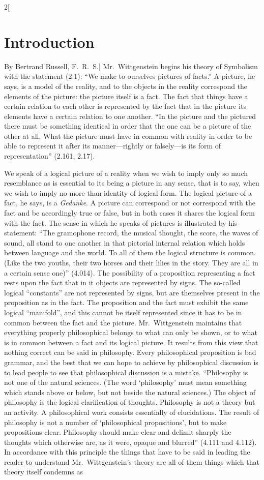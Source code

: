 \documentclass[oneside,openany,12pt]{book}
\begin{document}
\begin{multicols}{2}[\section*{Introduction}By Bertrand Russell, F.\ R.\ S.]
Mr.\ Wittgenstein begins his theory of Symbolism with the statement (2.1): ``We make to ourselves pictures of facts.'' A picture, he says, is a model of the reality, and to the objects in the reality correspond the elements of the picture: the picture itself is a fact. The fact that things have a certain relation to each other is represented by the fact that in the picture its elements have a certain relation to one another. ``In the picture and the pictured there must be something identical in order that the one can be a picture of the other at all. What the picture must have in common with reality in order to be able to represent it after its manner---rightly or falsely---is its form of representation'' (2.161, 2.17).

We speak of a logical picture of a reality when we wish to imply only so much resemblance as is essential to its being a picture in any sense, that is to say, when we wish to imply no more than identity of logical form. The logical picture of a fact, he says, is a \emph{Gedanke}. A picture can correspond or not correspond with the fact and be accordingly true or false, but in both cases it shares the logical form with the fact. The sense in which he speaks of pictures is illustrated by his statement: ``The gramophone record, the musical thought, the score, the waves of sound, all stand to one another in that pictorial internal relation which holds between language and the world. To all of them the logical structure is common. (Like the two youths, their two horses and their lilies in the story. They are all in a certain sense one)'' (4.014). The possibility of a proposition representing a fact rests upon the fact that in it objects are represented by signs. The so-called logical ``constants'' are not represented by signs, but are themselves present in the proposition as in the fact. The proposition and the fact must exhibit the same logical ``manifold'', and this cannot be itself represented since it has to be in common between the fact and the picture. Mr.\ Wittgenstein maintains that everything properly philosophical belongs to what can only be shown, or to what is in common between a fact and its logical picture. It results from this view that nothing correct can be said in philosophy. Every philosophical proposition is bad grammar, and the best that we can hope to achieve by philosophical discussion is to lead people to see that philosophical discussion is a mistake. ``Philosophy is not one of the natural sciences. (The word `philosophy' must mean something which stands above or below, but not beside the natural sciences.) The object of philosophy is the logical clarification of thoughts. Philosophy is not a theory but an activity. A philosophical work consists essentially of elucidations. The result of philosophy is not a number of `philosophical propositions', but to make propositions clear. Philosophy should make clear and delimit sharply the thoughts which otherwise are, as it were, opaque and blurred'' (4.111 and 4.112). In accordance with this principle the things that have to be said in leading the reader to understand Mr.\ Wittgenstein's theory are all of them things which that theory itself condemns as 
\end{multicols}
\end{document}
